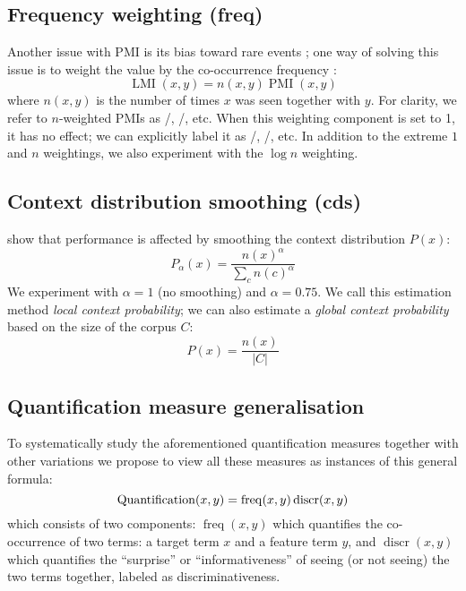 \subsection{Frequency weighting (freq)}
\label{sec:frequency-weighting}

Another issue with PMI is its bias toward rare events \cite{TACL570}; one way of solving this issue is to weight the value by the co-occurrence frequency \cite{Evert05}:
%
\begin{equation}
  \label{eq:lmi}
  \operatorname{LMI}(x, y) = n(x, y)\operatorname{PMI}(x, y)
\end{equation}
%
where $n(x, y)$ is the number of times $x$ was seen together with $y$. For clarity, we refer to $n$-weighted PMIs as \NPMI/, \NSPMI/, etc. When this weighting component is set to 1, it has no effect; we can explicitly label it as \PMI/, \SPMI/, etc. In addition to the extreme $1$ and $n$ weightings, we also experiment with the $\log n$ weighting.

\subsection{Context distribution smoothing (cds)}
\label{sec:cont-distr-smooth}

 show that performance is affected by smoothing the context distribution $P(x)$:
%
\begin{equation}
  \label{eq:cds}
  P_{\alpha}(x) = \frac{n(x)^{\alpha}}{\sum_{c}n(c)^{\alpha}}
\end{equation}
%
We experiment with $\alpha=1$ (no smoothing) and $\alpha = 0.75$. We call this estimation method \emph{local context probability}; we can also estimate a \emph{global context probability} based on the size of the corpus $C$:
%
\begin{equation}
  \label{eq:cds-nan}
  P(x) = \frac{n(x)}{|C|}
\end{equation}

\subsection{Quantification measure generalisation}
\label{sec:quantification-measures}

To systematically study the aforementioned quantification measures together with other variations we propose to view all these measures as instances of this general formula:
%
\begin{equation}
  \small
  \label{eq:association}
  \operatorname{Quantification}(x,y) = \operatorname{freq}(x, y)
                                       \operatorname{discr}(x, y)
\end{equation}
%
which consists of two components: $\operatorname{freq}(x, y)$ which quantifies the co-occurrence of two terms: a target term $x$ and a feature term $y$, and $\operatorname{discr}(x, y)$ which quantifies the ``surprise'' or ``informativeness'' of seeing (or not seeing) the two terms together,  labeled as discriminativeness.

